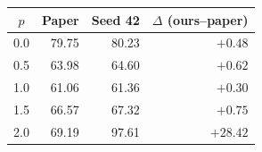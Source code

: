 \begin{tabular}{crrr}
\hline
$p$ & Paper & Seed 42 & $\Delta$ (ours--paper) \\
\hline
0.0 & 79.75 & 80.23 & $+0.48$ \\
0.5 & 63.98 & 64.60 & $+0.62$ \\
1.0 & 61.06 & 61.36 & $+0.30$ \\
1.5 & 66.57 & 67.32 & $+0.75$ \\
2.0 & 69.19 & 97.61 & $+28.42$ \\
\hline
\end{tabular}
